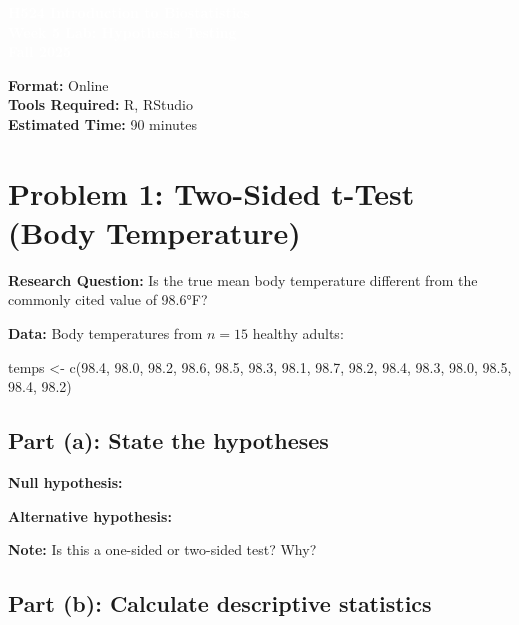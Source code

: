 \documentclass[11pt]{article}
\title{}
\author{}
\date{}
\begin{document}
\begin{tcolorbox}[colback=osaorange,colframe=black,boxrule=2pt,arc=0pt,left=3pt,right=3pt,top=6pt,bottom=6pt,boxsep=2pt]
\centering
\textcolor{white}{\textbf{\Large H524 Introduction to Biostatistics}}\\
\textcolor{white}{\textbf{\Large Week 5 Lab: Hypothesis Testing}}\\
\textcolor{white}{\textbf{\Large Fall 2025}}
\end{tcolorbox}

\vspace{8pt}

\noindent\textbf{Format:} Online\\
\textbf{Tools Required:} R, RStudio\\
\textbf{Estimated Time:} 90 minutes

\section*{Problem 1: Two-Sided t-Test (Body Temperature)}

\textbf{Research Question:} Is the true mean body temperature different from the commonly cited value of 98.6°F?

\textbf{Data:} Body temperatures from $n = 15$ healthy adults:
\begin{rcode}
temps <- c(98.4, 98.0, 98.2, 98.6, 98.5, 98.3, 98.1, 98.7,
           98.2, 98.4, 98.3, 98.0, 98.5, 98.4, 98.2)
\end{rcode}

\subsection*{Part (a): State the hypotheses}

\textbf{Null hypothesis:}

\vspace{1cm}

\textbf{Alternative hypothesis:}

\vspace{1cm}

\textbf{Note:} Is this a one-sided or two-sided test? Why?

\vspace{1cm}

\subsection*{Part (b): Calculate descriptive statistics}
\end{document}
